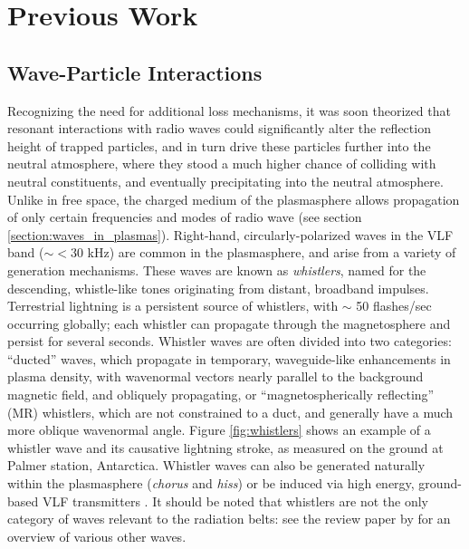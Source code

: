 \section{Previous Work}

\subsection{Wave-Particle Interactions}
Recognizing the need for additional loss mechanisms, it was soon theorized that resonant interactions with radio waves could significantly alter the reflection height of trapped particles, and in turn drive these particles further into the neutral atmosphere, where they stood a much higher chance of colliding with neutral constituents, and eventually precipitating into the neutral atmosphere. Unlike in free space, the charged medium of the plasmasphere allows propagation of only certain frequencies and modes of radio wave (see section \ref{section:waves_in_plasmas}). Right-hand, circularly-polarized waves in the VLF band ($\sim < 30 $ kHz) are common in the plasmasphere, and arise from a variety of generation mechanisms. These waves are known as \emph{whistlers}, named for the descending, whistle-like tones originating from distant, broadband impulses. Terrestrial lightning is a persistent source of whistlers, with $\sim$ 50 flashes/sec occurring globally; each whistler can propagate through the magnetosphere and persist for several seconds. Whistler waves are often divided into two categories: ``ducted'' waves, which propagate in temporary, waveguide-like enhancements in plasma density, with wavenormal vectors nearly parallel to the background magnetic field, and obliquely propagating, or ``magnetospherically reflecting'' (MR) whistlers, which are not constrained to a duct, and generally have a much more oblique wavenormal angle. Figure \ref{fig:whistlers} shows an example of a whistler wave and its causative lightning stroke, as measured on the ground at Palmer station, Antarctica. 
Whistler waves can also be generated naturally within the plasmasphere (\emph{chorus} and \emph{hiss}) or be induced via high energy, ground-based VLF transmitters \citep{Graf2013}. It should be noted that whistlers are not the only category of waves relevant to the radiation belts: see the review paper by \cite{Thorne2010a} for an overview of various other waves.

